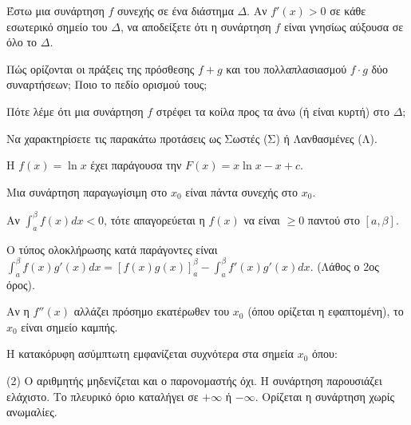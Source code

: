 \documentclass[11pt,a4paper]{article}
\newcommand{\kerkissans}[1]{{\fontfamily{maksf}\selectfont \textbf{#1}}}
\renewcommand{\textdexiakeraia}{}
\newcommand{\dint}{\displaystyle\int}
\newcommand\themanum{A}
\newcounter{thema}[section]
\renewcommand{\thethema}{\arabic{thema}}
\newcommand{\Thema}{\refstepcounter{thema}{\textbf{\textcolor{black}{\faPenSquare\ \  \large \kerkissans{\textbf{\thethemaο\hspace{2mm}Διαγώνισμα - Θέμα \themanum}}}}}\hspace{0mm}}{}
\newenvironment{thema}[1]
{\begin{tcolorbox}[title=\Thema\kerkissans{\textbf{\large{  #1}}},breakable,
enhanced standard,titlerule=0pt,toprule=0pt, rightrule=0pt, bottomrule=0pt,
colback=white,left=0mm,top=1mm,bottom=0mm,
boxrule=0pt,
colframe=white,leftrule=0mm,sharp corners,coltitle=black]
\renewcommand{\themanum}{#1}}
{\end{tcolorbox}}
\begin{document}
\begin{thema}{A}
\begin{erwthma}
    \item Έστω μια συνάρτηση $f$ συνεχής σε ένα διάστημα $\Delta$. Αν $f'(x)>0$ σε κάθε εσωτερικό σημείο του $\Delta$, να αποδείξετε ότι η συνάρτηση $f$ είναι γνησίως αύξουσα σε όλο το $\Delta$.
    \item Πώς ορίζονται οι πράξεις της πρόσθεσης $f+g$ και του πολλαπλασιασμού $f \cdot g$ δύο συναρτήσεων; Ποιο το πεδίο ορισμού τους;
    \item Πότε λέμε ότι μια συνάρτηση $f$ στρέφει τα κοίλα προς τα άνω (ή είναι κυρτή) στο $\Delta$;
    \item Να χαρακτηρίσετε τις παρακάτω προτάσεις ως Σωστές (Σ) ή Λανθασμένες (Λ).
    \begin{alist}
        \item Η $f(x) = \ln x$ έχει παράγουσα την $F(x) = x\ln x - x + c$.
        \item Μια συνάρτηση παραγωγίσιμη στο $x_0$ είναι πάντα συνεχής στο $x_0$.
        \item Αν $\dint_a^\beta f(x) dx < 0$, τότε απαγορεύεται η $f(x)$ να είναι $\ge 0$ παντού στο $[a, \beta]$.
        \item Ο τύπος ολοκλήρωσης κατά παράγοντες είναι $\dint_a^\beta f(x)g'(x) dx = [f(x)g(x)]_a^\beta - \dint_a^\beta f'(x)g'(x) dx$. (Λάθος ο 2ος όρος).
        \item Αν η $f''(x)$ αλλάζει πρόσημο εκατέρωθεν του $x_0$ (όπου ορίζεται η εφαπτομένη), το $x_0$ είναι σημείο καμπής.
    \end{alist}
    \item Η κατακόρυφη ασύμπτωτη εμφανίζεται συχνότερα στα σημεία $x_0$ όπου:
    \begin{tasks}[label=\let\textdexiakeraia\relax\alph*.](2)
        \task Ο αριθμητής μηδενίζεται και ο παρονομαστής όχι.
        \task Η συνάρτηση παρουσιάζει ελάχιστο.
        \task Το πλευρικό όριο καταλήγει σε $+\infty$ ή $-\infty$.
        \task Ορίζεται η συνάρτηση χωρίς ανωμαλίες.
    \end{tasks}
\end{erwthma}
\end{thema}
\vspace{1cm}
\end{document}
